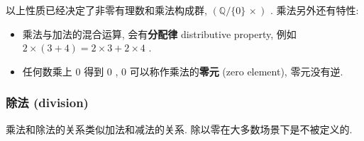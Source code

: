 以上性质已经决定了非零有理数和乘法构成群, \((\mathbb{Q}/\{0\}\,×)\) .
乘法另外还有特性:

\begin{itemize}
\tightlist
\item
  乘法与加法的混合运算, 会有\textbf{分配律} distributive property, 例如
  \(2×(3+4)=2×3+2×4\) .
\item
  任何数乘上 \(0\) 得到 \(0\) , \(0\) 可以称作乘法的\textbf{零元} (zero
  element), 零元没有逆.
\end{itemize}

\hypertarget{ux9664ux6cd5-division}{%
\subsubsection{除法 (division)}\label{ux9664ux6cd5-division}}

乘法和除法的关系类似加法和减法的关系. 除以零在大多数场景下是不被定义的.
